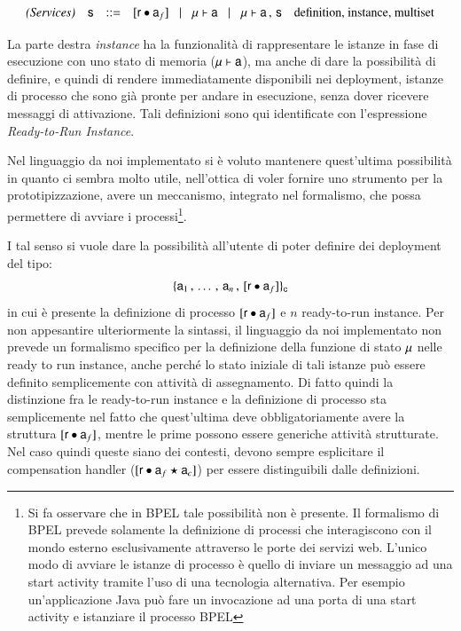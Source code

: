 $$
\begin{array}{rcccl}
\textit{(Services)} & {\sf s} & ::= &
[{\sf r} \bullet {\sf a}_f] \!\quad | \quad\!
{\sf \mu} \vdash {\sf a} \!\quad | \quad\!
{\sf \mu} \vdash {\sf a} \,,\, {\sf s} & \textrm{definition, instance,
multiset}
\end{array}
$$ 

La parte destra \emph{instance} ha la funzionalità di rappresentare le istanze in
fase di esecuzione con uno stato di memoria (${\sf \mu} \vdash {\sf a}$), ma anche di
dare la possibilità di definire, e quindi di rendere immediatamente disponibili
nei deployment, istanze di processo che sono già pronte per andare in
esecuzione, senza dover ricevere messaggi di attivazione.
Tali definizioni sono qui identificate con l'espressione
\emph{Ready-to-Run Instance}.

Nel linguaggio da noi implementato si è voluto mantenere quest'ultima
possibilità in quanto ci sembra molto utile, nell'ottica di voler fornire uno
strumento per la prototipizzazione, avere un meccanismo, integrato nel
formalismo, che possa permettere di avviare i processi\footnote{Si fa osservare
che in BPEL tale possibilità non è presente. Il formalismo di BPEL prevede
solamente la definizione di processi che interagiscono con il mondo esterno
esclusivamente attraverso le porte dei servizi web. L'unico modo di avviare le
istanze di processo è quello di inviare un messaggio ad una start activity tramite l'uso
di una tecnologia alternativa. Per esempio un'applicazione Java può fare un
invocazione ad una porta di una start activity e istanziare il processo BPEL}.

I tal senso si vuole dare la possibilità all'utente di poter definire dei
deployment del tipo: 
$$
\{ 
{\sf a}_1 \,,\, \ldots \,,\, {\sf a}_n \,,\,
[{\sf r} \bullet {\sf a}_f]  
 \}_{{\sf c}}
$$
in cui è presente la definizione di processo  $[{\sf r} \bullet {\sf a}_f]$ e $n$
ready-to-run instance. Per non appesantire ulteriormente la sintassi, il
linguaggio da noi implementato non prevede un formalismo specifico per la definizione della funzione di stato ${\sf \mu}$ nelle ready to run instance, anche perché lo stato
iniziale di tali istanze può essere definito semplicemente con attività di
assegnamento. Di fatto quindi la distinzione fra le ready-to-run instance e la
definizione di processo sta semplicemente nel fatto che quest'ultima deve
obbligatoriamente avere la struttura  $[{\sf r} \bullet {\sf a}_f]$, mentre le prime
possono essere generiche attività strutturate. Nel caso quindi queste siano dei
contesti, devono sempre esplicitare il compensation handler
($[{\sf r} \bullet {\sf a}_f \star {\sf a}_c]$) per essere distinguibili dalle definizioni.

